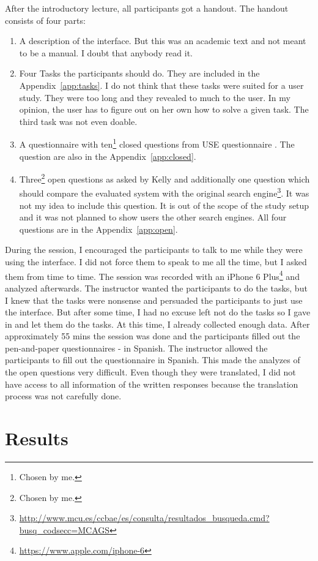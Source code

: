 \documentclass[11pt]{report}
\begin{document}
	After the introductory lecture, all participants got a handout. The handout consists of four parts:
\begin{enumerate}
	\item A description of the interface. But this was an academic text and not meant to be a manual. I doubt that anybody read it.
	\item Four Tasks the participants should do. They are included in the Appendix~\ref{app:tasks}. I do not think that these tasks were suited for a user study. They were too long and they revealed to much to the user. In my opinion, the user has to figure out on her own how to solve a given task. The third task was not even doable.
	\item A questionnaire with ten\footnote{Chosen by me.} closed questions from USE questionnaire \cite{lund2001measuring}. The question are also in the Appendix~\ref{app:closed}.
	\item Three\footnote{Chosen by me.} open questions as asked by Kelly \cite{Kelly2008} and additionally one question which should compare the evaluated system with the original search engine\footnote{\url{http://www.mcu.es/ccbae/es/consulta/resultados_busqueda.cmd?busq_codsecc=MCAGS}}. It was not my idea to include this question. It is out of the scope of the study setup and it was not planned to show users the other search engines. All four questions are in the Appendix~\ref{app:open}.
\end{enumerate}

During the session, I encouraged the participants to talk to me while they were using the interface. I did not force them to speak to me all the time, but I asked them from time to time. The session was recorded with an iPhone 6 Plus\footnote{\url{https://www.apple.com/iphone-6}} and analyzed afterwards. The instructor wanted the participants to do the tasks, but I knew that the tasks were nonsense and persuaded the participants to just use the interface. But after some time, I had no excuse left not do the tasks so I gave in and let them do the tasks. At this time, I already collected enough data. After approximately  55 mins the session was done and the participants filled out the pen-and-paper questionnaires - in Spanish. The instructor allowed the participants to fill out the questionnaire in Spanish. This made the analyzes of the open questions very difficult. Even though they were translated, I did not have access to all information of the written responses because the translation process was not carefully done.
\section{Results}
\end{document}
